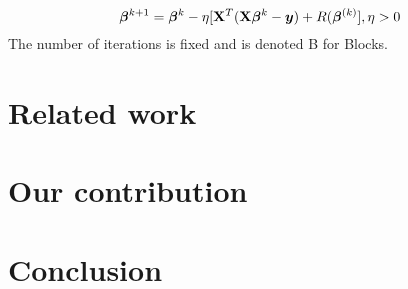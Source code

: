 \documentclass[12pt,twoside]{article}
\begin{document}
  $$ \bm{\beta}^{k+1} =  \bm{\beta}^{k} -\eta [{\mathbf X}^T ({\mathbf X} \bm{\beta}^{k} - \bm{y}) + R(\bm{\beta}^{(k)}], \eta > 0$$
  The number of iterations is fixed and is denoted B for Blocks.
  
  
\section{Related work} 


\section{Our contribution}

\section{Conclusion}

 

\end{document}
